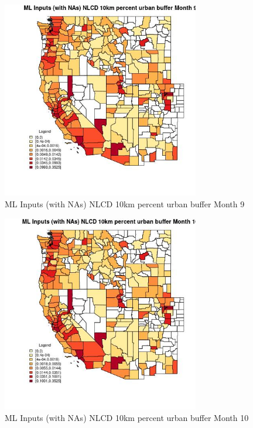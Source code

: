 \begin{figure} 
\centering  
\includegraphics[width=0.77\textwidth]{Code_Outputs/Report_ML_input_PM25_Step4_part_e_de_duplicated_aves_compiled_2019-05-21wNAs_CountyNLCD_10km_percent_urban_buffermedianMonth9.jpg} 
\caption{\label{fig:Report_ML_input_PM25_Step4_part_e_de_duplicated_aves_compiled_2019-05-21wNAsCountyNLCD_10km_percent_urban_buffermedianMonth9}ML Inputs (with NAs) NLCD 10km percent urban buffer Month 9} 
\end{figure} 
 

\begin{figure} 
\centering  
\includegraphics[width=0.77\textwidth]{Code_Outputs/Report_ML_input_PM25_Step4_part_e_de_duplicated_aves_compiled_2019-05-21wNAs_CountyNLCD_10km_percent_urban_buffermedianMonth10.jpg} 
\caption{\label{fig:Report_ML_input_PM25_Step4_part_e_de_duplicated_aves_compiled_2019-05-21wNAsCountyNLCD_10km_percent_urban_buffermedianMonth10}ML Inputs (with NAs) NLCD 10km percent urban buffer Month 10} 
\end{figure} 
 

